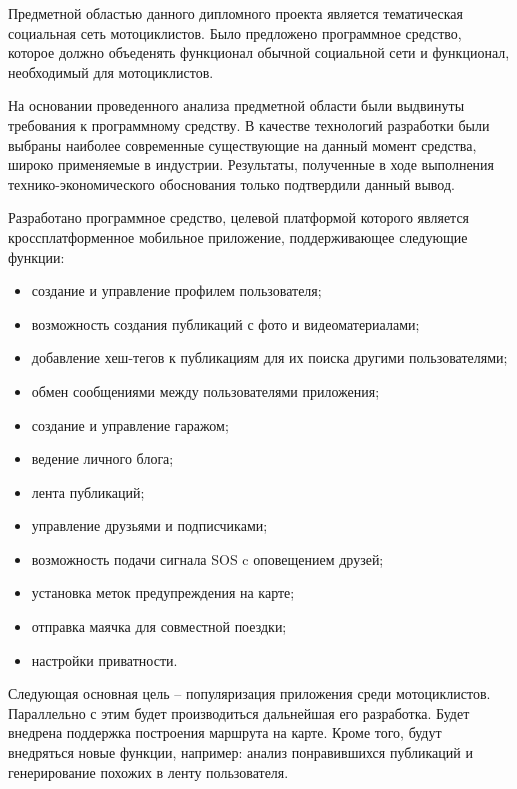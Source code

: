 
Предметной областью данного дипломного проекта является тематическая социальная сеть мотоциклистов. 
Было предложено программное средство, которое должно объеденять функционал обычной социальной сети и функционал, необходимый для мотоциклистов.

На основании проведенного анализа предметной области были выдвинуты требования к программному средству. В качестве технологий разработки были выбраны наиболее современные существующие на данный момент средства, широко применяемые в индустрии. 
Результаты, полученные в ходе выполнения технико-экономического обоснования только подтвердили данный вывод.

Разработано программное средство, целевой платформой которого является кроссплатформенное мобильное приложение, поддерживающее следующие функции:
\begin{itemize}
	\item создание и управление профилем пользователя;
	\item возможность создания публикаций с фото и видеоматериалами;
	\item добавление хеш-тегов к публикациям для их поиска другими пользователями;
	\item обмен сообщениями между пользователями приложения;
	\item создание и управление гаражом;
	\item ведение личного блога;
	\item лента публикаций;
	\item управление друзьями и подписчиками;
	\item возможность подачи сигнала SOS c оповещением друзей;
	\item установка меток предупреждения на карте;
	\item отправка маячка для совместной поездки;
	\item настройки приватности.
\end{itemize}

Следующая основная цель -- популяризация приложения среди мотоциклистов. Параллельно с этим будет производиться дальнейшая его разработка. Будет внедрена поддержка построения маршрута на карте. Кроме того, будут внедряться новые функции, например: анализ понравившихся публикаций и генерирование похожих в ленту пользователя. 